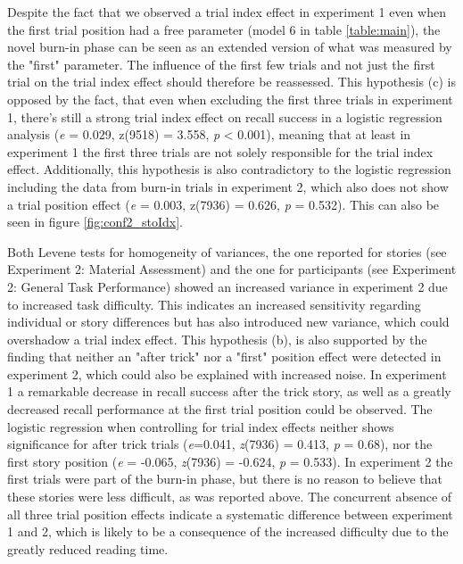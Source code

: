 \documentclass[a4paper,man,natbib,floatsintext,import]{apa6}
\begin{document}
Despite the fact that we observed a trial index effect in experiment 1 even when the first trial position had a free parameter (model 6 in table \ref{table:main}), the novel burn-in phase can be seen as an extended version of what was measured by the "first" parameter. The influence of the first few trials and not just the first trial on the trial index effect should therefore be reassessed. This hypothesis (c) is opposed by the fact, that even when excluding the first three trials in experiment 1, there's still a strong trial index effect on recall success in a logistic regression analysis (\textit{e} = 0.029, z(9518) = 3.558, \textit{p} < 0.001), meaning that at least in experiment 1 the first three trials are not solely responsible for the trial index effect. Additionally, this hypothesis is also contradictory to the logistic regression including the data from burn-in trials in experiment 2, which also does not show a trial position effect (\textit{e} = 0.003, z(7936) = 0.626, \textit{p} = 0.532). This can also be seen in figure \ref{fig:conf2_stoIdx}.

Both Levene tests for homogeneity of variances, the one reported for stories (see Experiment 2: Material Assessment) and the one for participants (see Experiment 2: General Task Performance) showed an increased variance in experiment 2 due to increased task difficulty. This indicates an increased sensitivity regarding individual or story differences but has also introduced new variance, which could overshadow a trial index effect. This hypothesis (b), is also supported by the finding that neither an "after trick" nor a "first" position effect were detected in experiment 2, which could also be explained with increased noise. In experiment 1 a remarkable decrease in recall success after the trick story, as well as a greatly decreased recall performance at the first trial position could be observed. The logistic regression when controlling for trial index effects neither shows significance for after trick trials (\textit{e}=0.041, \textit{z}(7936) = 0.413, \textit{p} = 0.68), nor the first story position (\textit{e} = -0.065, \textit{z}(7936) = -0.624, \textit{p} = 0.533). In experiment 2 the first trials were part of the burn-in phase, but there is no reason to believe that these stories were less difficult, as was reported above. The concurrent absence of all three trial position effects indicate a systematic difference between experiment 1 and 2, which is likely to be a consequence of the increased difficulty due to the greatly reduced reading time.
\end{document}
